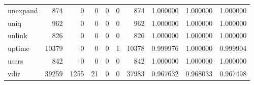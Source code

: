 \begin{tabular}{lrrrrrrrrr}
unexpand  &                                 874 &                                               0 &                                              0 &                                             0 &                                              0 &                                          874 &                                           1.000000 &                               1.000000 &                             1.000000 \\
uniq      &                                 962 &                                               0 &                                              0 &                                             0 &                                              0 &                                          962 &                                           1.000000 &                               1.000000 &                             1.000000 \\
unlink    &                                 826 &                                               0 &                                              0 &                                             0 &                                              0 &                                          826 &                                           1.000000 &                               1.000000 &                             1.000000 \\
uptime    &                               10379 &                                               0 &                                              0 &                                             0 &                                              1 &                                        10378 &                                           0.999976 &                               1.000000 &                             0.999904 \\
users     &                                 842 &                                               0 &                                              0 &                                             0 &                                              0 &                                          842 &                                           1.000000 &                               1.000000 &                             1.000000 \\
vdir      &                               39259 &                                            1255 &                                             21 &                                             0 &                                              0 &                                        37983 &                                           0.967632 &                               0.968033 &                             0.967498 \\

\end{tabular}
